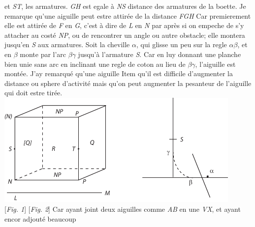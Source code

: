 et \textit{ST}, les armatures.
\newline%
\textit{GH} est egale \`{a} \textit{NS} distance des armatures\protect{}  de la boette.
\pend
\pstart%
Je remarque qu'une aiguille peut estre attir\'{e}e de la distance \textit{FGH} 
Car premierement elle est attir\'{e}e de \textit{F} en \textit{G}, c'est \`{a} dire de \textit{L} en \textit{N} par apr\`{e}s si on empeche de s'y attacher au cost\'{e} \textit{NP}, ou de rencontrer un angle ou autre obstacle; elle montera jusqu'en \textit{S} aux armatures.  
\pend 
\pstart Soit la cheville $\alpha$, qui glisse un peu sur la regle $\alpha \beta$, et en $\beta$ monte par l'arc $\beta \gamma$ jusqu'\`{a} l'armature \textit{S}.  
\pend
\pstart  Car en luy donnant une planche bien unie sans arc en inclinant une regle de coton\protect{} au lieu de $\beta \gamma$, l'aiguille est  mont\'{e}e.
\pend
\pstart
J'ay remarqu\'{e} qu'une aiguille 
Item qu'il est difficile d'augmenter la distance ou sphere d'activit\'{e} mais qu'on peut augmenter la pesanteur de l'aiguille qui doit estre tir\'{e}e. 
\pend
\newpage
\pstart
\centering
\includegraphics[width=0.9\textwidth]{images/37316r_fig23.pdf}\\
\vspace*{0.5mm}\hspace*{10mm}[\textit{Fig. 1}] \hspace*{60mm} [\textit{Fig. 2}]
\pend
\vspace{2.5em}
\pstart 
{}Car ayant joint deux aiguilles comme \textit{AB} en une \textit{VX}, et ayant encor adjout\'{e} beaucoup 
